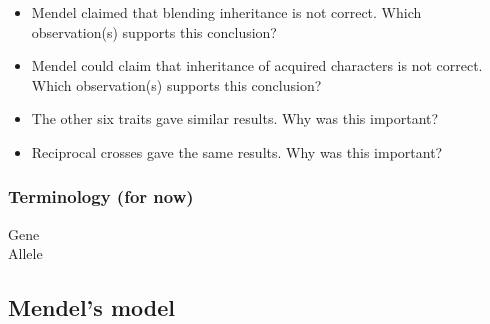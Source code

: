 \begin{frame}
    \begin{itemize}[<+->]
        \item Mendel claimed that blending inheritance is not correct. Which
            observation(s) supports this conclusion?

        \item Mendel could claim that inheritance of acquired characters is not
            correct. Which observation(s) supports this conclusion?

        \item The other six traits gave similar results. Why was this
            important?

        \item Reciprocal crosses gave the same results. Why was this important?
    \end{itemize}
\end{frame}

\begin{frame}
    \frametitle{Terminology (for now)}
    \begin{description}
        \item[Gene] 
        \item[Allele] 
    \end{description}
\end{frame}

\subsection{Mendel's model}

